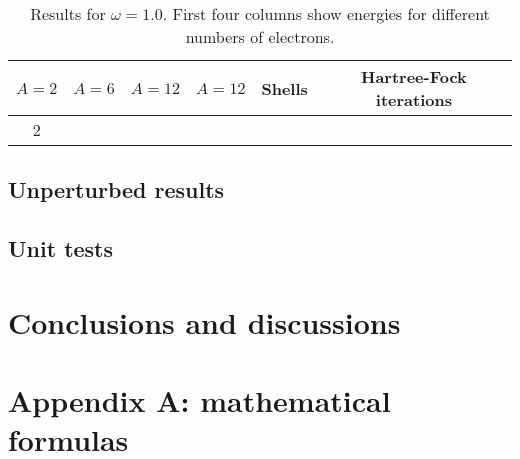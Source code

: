 \documentclass[11pt]{article}
\begin{document}
\begin{table}[H]
	\centering
	\begin{tabular}{c | c | c | c | c | c}
		\hline $A = 2$ 	& $A = 6$ 	& $A = 12$ 	& $A = 12$ 	& Shells 	& Hartree-Fock iterations 	\\ \hline
		2 			& 			& 			& 			&			&							\\
		\hline
	\end{tabular}
	\caption{Results for $\omega = 1.0$. First four columns show energies for different numbers of electrons.}
\end{table}


\subsection{Unperturbed results}
\subsection{Unit tests}

\section{Conclusions and discussions}

\section{Appendix A: mathematical formulas}
\end{document}
